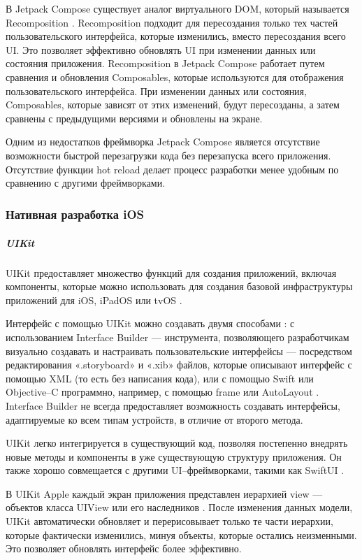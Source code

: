 В Jetpack Compose существует аналог виртуального DOM, который называется Recomposition \cite{jetpack-lifecycle}. 
Recomposition подходит для пересоздания только тех частей пользовательского интерфейса, которые изменились, вместо пересоздания всего UI. 
Это позволяет эффективно обновлять UI при изменении данных или состояния приложения.
Recomposition в Jetpack Compose работает путем сравнения и обновления Composables, которые используются для отображения пользовательского интерфейса. 
При изменении данных или состояния, Composables, которые зависят от этих изменений, будут пересозданы, а затем сравнены с предыдущими версиями и обновлены на экране.

Одним из недостатков фреймворка Jetpack Compose является отсутствие возможности быстрой перезагрузки кода без перезапуска всего приложения.
Отсутствие функции hot reload делает процесс разработки менее удобным по сравнению с другими фреймворками.
\subparagraph{}  
\subsubsection{Нативная разработка iOS} 

\subparagraph{UIKit} 
\subparagraph{}  
UIKit предоставляет множество функций для создания приложений, включая компоненты, которые можно использовать для создания базовой инфраструктуры приложений для iOS, iPadOS или tvOS \cite{uikit}.

Интерфейс с помощью UIKit можно создавать двумя способами \cite{uikit2}: с использованием Interface Builder --- инструмента, позволяющего разработчикам визуально создавать и настраивать пользовательские интерфейсы --- посредством редактирования «.storyboard» и «.xib» файлов, которые описывают интерфейс с помощью XML (то есть без написания кода), или с помощью Swift или Objective--C программно, например, с помощью frame \cite{uikit-frame} или AutoLayout \cite{uikit-autolayout}. 
Interface Builder не всегда предоставляет возможность создавать интерфейсы, адаптируемые ко всем типам устройств, в отличие от второго метода. 

UIKit легко интегрируется в существующий код, позволяя постепенно внедрять новые методы и компоненты в уже существующую структуру приложения. 
Он также хорошо совмещается с другими UI--фреймворками, такими как SwiftUI \cite{uikit-integr}.

В UIKit Apple каждый экран приложения представлен иерархией view --- объектов класса UIView или его наследников \cite{uikit-uiview}. 
После изменения данных модели, UIKit автоматически обновляет и перерисовывает только те части иерархии, которые фактически изменились, минуя объекты, которые остались неизменными.
Это позволяет обновлять интерфейс более эффективно.

